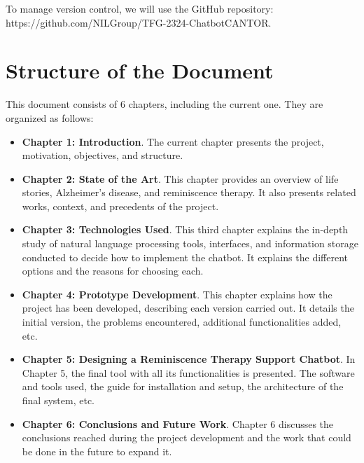 To manage version control, we will use the GitHub repository: \\
https://github.com/NILGroup/TFG-2324-ChatbotCANTOR.

\section{Structure of the Document}
This document consists of 6 chapters, including the current one. They are organized as follows:
\begin{itemize}
	\item \textbf{Chapter 1: Introduction}. The current chapter presents the project, motivation, objectives, and structure.
	\item \textbf{Chapter 2: State of the Art}. This chapter provides an overview of life stories, Alzheimer's disease, and reminiscence therapy. It also presents related works, context, and precedents of the project.
	\item \textbf{Chapter 3: Technologies Used}. This third chapter explains the in-depth study of natural language processing tools, interfaces, and information storage conducted to decide how to implement the chatbot. It explains the different options and the reasons for choosing each.
	\item \textbf{Chapter 4: Prototype Development}. This chapter explains how the project has been developed, describing each version carried out. It details the initial version, the problems encountered, additional functionalities added, etc.
	\item \textbf{Chapter 5: Designing a Reminiscence Therapy Support Chatbot}. In Chapter 5, the final tool with all its functionalities is presented. The software and tools used, the guide for installation and setup, the architecture of the final system, etc.
	\item \textbf{Chapter 6: Conclusions and Future Work}. Chapter 6 discusses the conclusions reached during the project development and the work that could be done in the future to expand it.
\end{itemize}